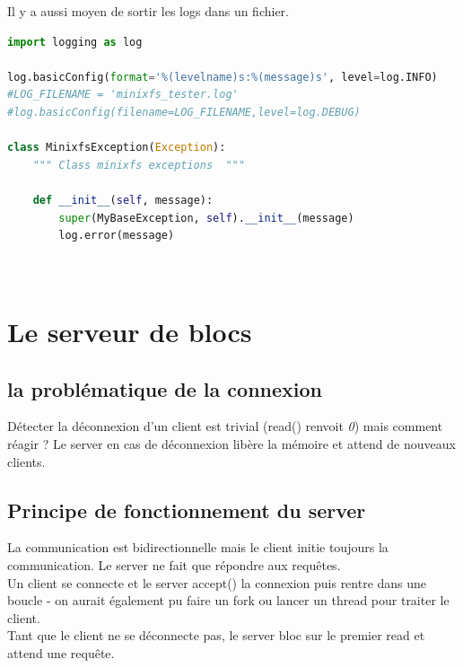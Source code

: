 \documentclass[a4paper,12pt]{article}
\begin{document}
Il y a aussi moyen de sortir les logs dans un fichier.\\


\begin{lstlisting}[language=python, caption=initialisation logs et exception MinixfsError()]
import logging as log

log.basicConfig(format='%(levelname)s:%(message)s', level=log.INFO)
#LOG_FILENAME = 'minixfs_tester.log'
#log.basicConfig(filename=LOG_FILENAME,level=log.DEBUG)

class MinixfsException(Exception):
    """ Class minixfs exceptions  """

    def __init__(self, message):
        super(MyBaseException, self).__init__(message)
        log.error(message)
        
        
\end{lstlisting}


\vspace{1cm}

\section{Le serveur de blocs}


\subsection{la problématique de la connexion}

Détecter la déconnexion d'un client est trivial (read() renvoit \emph{0}) mais comment réagir ? Le server en cas de déconnexion libère la mémoire et attend de nouveaux clients.\\

\subsection{Principe de fonctionnement du server}

La communication est bidirectionnelle mais le client initie toujours la communication. Le server ne fait que répondre aux requêtes.\\

Un client se connecte et le server accept() la connexion puis rentre dans une boucle - on aurait également pu faire un fork ou lancer un thread pour traiter le client.\\

Tant que le client ne se déconnecte pas, le server bloc sur le premier read et attend une requête.\\
\end{document}
